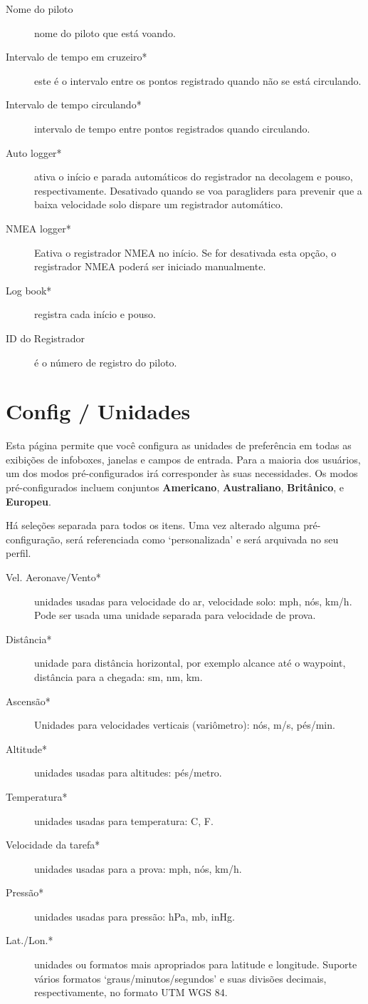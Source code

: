 \begin{description}
\item[Nome do piloto] nome do piloto que está voando.
\item[Intervalo de tempo em cruzeiro*]  este é o intervalo entre os pontos registrado quando não se está circulando.
\item[Intervalo de tempo circulando*]  intervalo de tempo entre pontos registrados quando circulando.
\item[Auto logger*]  ativa o início e parada automáticos do registrador na decolagem e pouso, respectivamente.  Desativado quando se voa paragliders para prevenir que a baixa velocidade solo dispare um registrador automático.
\item[NMEA logger*]  Eativa o registrador NMEA no início.  Se for desativada esta opção, o registrador NMEA poderá ser iniciado manualmente.
\item[Log book*]  registra cada início e pouso.
\item[ID do Registrador] é o número de registro do piloto.
\end{description}


\section{Config / Unidades}

Esta página permite que você configura as unidades de preferência em todas as exibições de infoboxes, janelas e campos de entrada.   Para a maioria dos usuários, um dos modos pré-configurados irá corresponder às suas necessidades.  Os modos pré-configurados incluem conjuntos  {\bf Americano}, {\bf Australiano}, {\bf Britânico}, 
e {\bf Europeu}.

Há seleções separada para todos os itens.  Uma vez alterado alguma pré-configuração, será referenciada como ‘personalizada’ e será arquivada no seu perfil.

\begin{description}
\item[Vel. Aeronave/Vento*]  unidades usadas para velocidade do ar, velocidade solo: mph, nós, km/h.  Pode ser usada uma unidade separada para velocidade de prova. 
\item[Distância*]  unidade para distância horizontal, por exemplo alcance até o waypoint, distância para a chegada: sm, nm, km.
\item[Ascensão*]  Unidades para velocidades verticais (variômetro): nós, m/s, pés/min. 
\item[Altitude*] unidades usadas para altitudes: pés/metro.
\item[Temperatura*]  unidades usadas para temperatura: \degree C, \degree F.
\item[Velocidade da tarefa*] unidades usadas para a prova: mph, nós, km/h.
\item[Pressão*]  unidades usadas para pressão: hPa,  mb, inHg.
\item[Lat./Lon.*] unidades ou formatos mais apropriados para latitude e longitude.  Suporte vários formatos ‘graus/minutos/segundos’ e suas divisões decimais, respectivamente, no formato UTM WGS 84.
\end{description}


